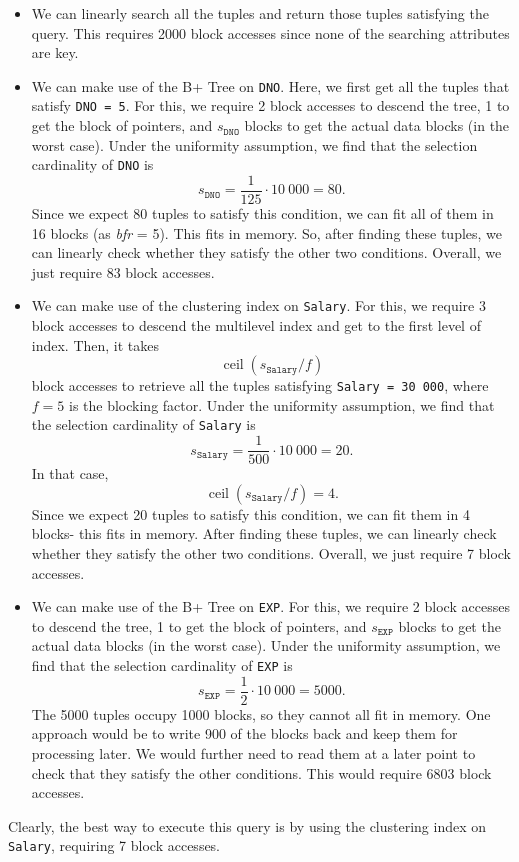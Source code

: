 \documentclass[a4paper, openany]{memoir}
\theoremstyle{definition}
\begin{document}
\begin{answer}
    \begin{itemize}
        \item We can linearly search all the tuples and return those tuples satisfying the query. This requires 2000 block accesses since none of the searching attributes are key.
        
        \item We can make use of the B+ Tree on \texttt{DNO}. Here, we first get all the tuples that satisfy \texttt{DNO = 5}. For this, we require 2 block accesses to descend the tree, 1 to get the block of pointers, and $s_{\texttt{DNO}}$ blocks to get the actual data blocks (in the worst case). Under the uniformity assumption, we find that the selection cardinality of \texttt{DNO} is 
        \[s_{\texttt{DNO}} = \frac{1}{125} \cdot 10 \ 000 = 80.\]
        Since we expect 80 tuples to satisfy this condition, we can fit all of them in 16 blocks (as \textit{bfr} = 5). This fits in memory. So, after finding these tuples, we can linearly check whether they satisfy the other two conditions. Overall, we just require 83 block accesses.
        
        \item We can make use of the clustering index on \texttt{Salary}. For this, we require 3 block accesses to descend the multilevel index and get to the first level of index. Then, it takes
        \[\operatorname{ceil}(s_{\texttt{Salary}}/f)\]
        block accesses to retrieve all the tuples satisfying \texttt{Salary = 30 000}, where $f = 5$ is the blocking factor. Under the uniformity assumption, we find that the selection cardinality of \texttt{Salary} is
        \[s_{\texttt{Salary}} = \frac{1}{500} \cdot 10 \ 000 = 20.\]
        In that case,
        \[\operatorname{ceil}(s_{\texttt{Salary}}/f) = 4.\]
        Since we expect 20 tuples to satisfy this condition, we can fit them in 4 blocks- this fits in memory. After finding these tuples, we can linearly check whether they satisfy the other two conditions. Overall, we just require 7 block accesses.

        \item We can make use of the B+ Tree on \texttt{EXP}. For this, we require 2 block accesses to descend the tree, 1 to get the block of pointers, and $s_{\texttt{EXP}}$ blocks to get the actual data blocks (in the worst case). Under the uniformity assumption, we find that the selection cardinality of \texttt{EXP} is
        \[s_{\texttt{EXP}} = \frac{1}{2} \cdot 10 \ 000 = 5000.\]
        The 5000 tuples occupy 1000 blocks, so they cannot all fit in memory. One approach would be to write 900 of the blocks back and keep them for processing later. We would further need to read them at a later point to check that they satisfy the other conditions. This would require 6803 block accesses.
    \end{itemize}
    Clearly, the best way to execute this query is by using the clustering index on \texttt{Salary}, requiring 7 block accesses.
\end{answer}
\end{document}
